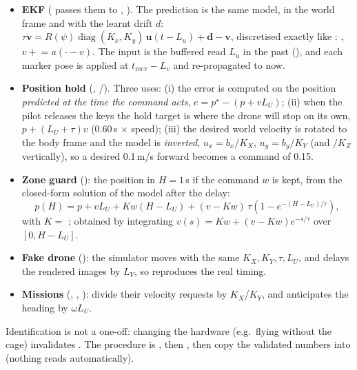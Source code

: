 \begin{itemize}
\item \textbf{EKF} ( passes them to , ). The prediction is
the same model, in the world frame and with the learnt drift $d$:
$\tau\dot{\mathbf v} = R(\psi)\operatorname{diag}(K_x, K_y)\,\mathbf u(t - L_u) + \mathbf d - \mathbf v$,
discretised exactly like : , $v \mathrel{+}= a(\cdot - v)$. The input
is the buffered  read $L_u$ in the past (), and each marker pose is applied
at $t_{\text{recv}} - L_v$ and re-propagated to now.
\item \textbf{Position hold} (, /). Three uses:
(i) the error is computed on the position \emph{predicted at the time the command acts},
$e = p^\star - (p + v L_U)$; (ii) when the pilot releases the keys the hold target is where the drone will stop
on its own, $p + (L_U + \tau)v$ (0.60\,s $\times$ speed); (iii) the desired world velocity is rotated to the body
frame and the model is \emph{inverted}, $u_x = b_x / K_X$, $u_y = b_y / K_Y$ (and $/K_Z$ vertically), so a
desired 0.1\,m/s forward becomes a command of 0.15.
\item \textbf{Zone guard} (): the position in $H = 1$\,s if the command $w$ is kept, from the
closed-form solution of the model after the delay:
$$
p(H) = p + v L_U + K w (H - L_U) + (v - K w)\,\tau\left(1 - e^{-(H - L_U)/\tau}\right),
$$
with $K = $ ; obtained by integrating $v(s) = Kw + (v-Kw)e^{-s/\tau}$ over $[0, H-L_U]$.
\item \textbf{Fake drone} (): the simulator moves with the same $K_X, K_Y, \tau, L_U$, and
delays the rendered images by $L_V$, so  reproduces the real timing.
\item \textbf{Missions} (, , ): divide their velocity
requests by $K_X$/$K_Y$, and  anticipates the heading by $\omega L_U$.
\end{itemize}

\begin{keypoint}
Identification is not a one-off: changing the hardware (e.g.\ flying without the cage) invalidates
. The procedure is , then , then copy the validated
numbers into  (nothing reads  automatically).
\end{keypoint}

